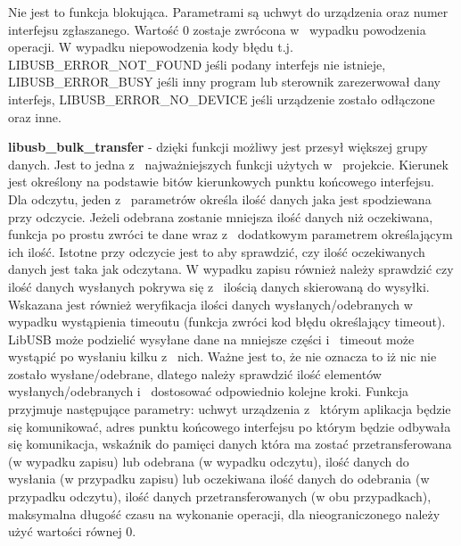 \documentclass{BscUS}
\begin{document}
\begin{itemize}
{Nie jest to funkcja blokująca.
Parametrami są uchwyt do urządzenia oraz numer interfejsu zgłaszanego.
Wartość 0 zostaje zwrócona w~ wypadku powodzenia operacji.
W wypadku niepowodzenia kody błędu t.j. LIBUSB\_ERROR\_NOT\_FOUND jeśli podany interfejs nie istnieje, LIBUSB\_ERROR\_BUSY jeśli inny program lub sterownik zarezerwował dany interfejs, LIBUSB\_ERROR\_NO\_DEVICE jeśli urządzenie zostało odłączone oraz inne.
\item \textbf{libusb\_bulk\_transfer} - dzięki funkcji możliwy jest przesył większej grupy danych. Jest to jedna z~ najważniejszych funkcji użytych w~ projekcie.
Kierunek jest określony na podstawie bitów kierunkowych punktu końcowego interfejsu.
Dla odczytu, jeden z~ parametrów określa ilość danych jaka jest spodziewana przy odczycie. Jeżeli odebrana zostanie mniejsza ilość danych niż oczekiwana, funkcja po prostu zwróci te dane wraz z~ dodatkowym parametrem określającym ich ilość. Istotne przy odczycie jest to aby sprawdzić, czy ilość oczekiwanych danych jest taka jak odczytana.
W wypadku zapisu również należy sprawdzić czy ilość danych wysłanych pokrywa się z~ ilością danych skierowaną do wysyłki.
Wskazana jest również weryfikacja ilości danych wysłanych/odebranych w~ wypadku wystąpienia timeoutu (funkcja zwróci kod błędu określający timeout). LibUSB może podzielić wysyłane dane na mniejsze części i~ timeout może wystąpić po wysłaniu kilku z~ nich. Ważne jest to, że nie oznacza to iż nic nie zostało wysłane/odebrane, dlatego należy sprawdzić ilość elementów wysłanych/odebranych i~ dostosować odpowiednio kolejne kroki.
Funkcja przyjmuje następujące parametry: uchwyt urządzenia z~ którym aplikacja będzie się komunikować, adres punktu końcowego interfejsu po którym będzie odbywała się komunikacja, wskaźnik do pamięci danych która ma zostać przetransferowana (w wypadku zapisu) lub odebrana (w wypadku odczytu), ilość danych do wysłania (w przypadku zapisu) lub oczekiwana ilość danych do odebrania (w przypadku odczytu), ilość danych przetransferowanych (w obu przypadkach), maksymalna długość czasu na wykonanie operacji, dla nieograniczonego należy użyć wartości równej 0.
}
\end{itemize}
\end{document}
